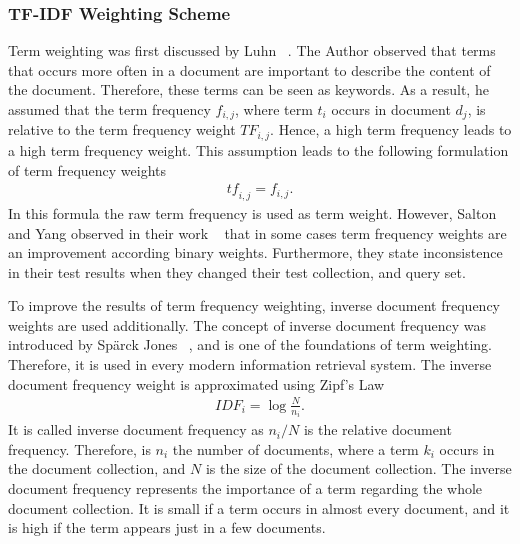 \subsubsection{TF-IDF Weighting Scheme}
\label{sec:tfidf}

Term weighting was first discussed by Luhn ~\cite{Luhn_statistical-1957}. The Author observed that terms that occurs more often in a document are important to describe the content of the document. Therefore, these terms can be seen as keywords. As a result, he assumed that the term frequency $f_{i, j}$, where term $t_i$ occurs in document $d_j$, is relative to the term frequency weight $TF_{i, j}$. Hence, a high term frequency leads to a high term frequency weight. This assumption leads to the following formulation of term frequency weights
\begin{align}
  \label{raw_tf}
  \mathit{tf}_{i, j} = f_{i, j}.
\end{align}
In this formula the raw term frequency is used as term weight. However, Salton and Yang observed in their work ~\cite{FT023} that in some cases term frequency weights are an improvement according binary weights. Furthermore, they state inconsistence in their test results when they changed their test collection, and query set.

To improve the results of term frequency weighting, inverse document frequency weights are used additionally. The concept of inverse document frequency was introduced by Spärck Jones ~\cite{jones72astatistical}, and is one of the foundations of term weighting. Therefore, it is used in every modern information retrieval system. The inverse document frequency weight is approximated using Zipf's Law ~\cite{zipf1932selected}
\begin{align}
  \label{idf}
  \mathit{IDF}_i = \log \frac{N}{n_i}.
\end{align}
It is called inverse document frequency as $n_i/N$ is the relative document frequency. Therefore, is $n_i$ the number of documents, where a term $k_i$ occurs in the document collection, and $N$ is the size of the document collection. The inverse document frequency represents the importance of a term regarding the whole document collection. It is small if a term occurs in almost every document, and it is high if the term appears just in a few documents.


